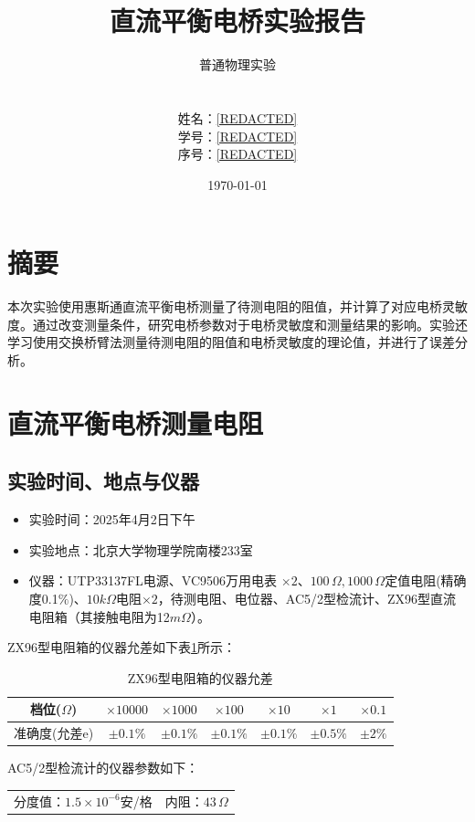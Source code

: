 \documentclass[12pt]{article}
\title{\Large\textbf{直流平衡电桥实验报告}}
\author{普通物理实验\\
        [REDACTED]\\
         \\
        姓名：\underline{\hspace{1cm}[REDACTED]\hspace{1cm}} \\
        学号：\underline{\hspace{0.5cm}[REDACTED]\hspace{0.5cm}} \\
        序号：\underline{\hspace{1.3cm}[REDACTED]\hspace{1.3cm}}}
\date{\today}
\begin{document}
\maketitle
\section{摘要}
\quad 本次实验使用惠斯通直流平衡电桥测量了待测电阻的阻值，并计算了对应电桥灵敏度。通过改变测量条件，研究电桥参数对于电桥灵敏度和测量结果的影响。实验还学习使用交换桥臂法测量待测电阻的阻值和电桥灵敏度的理论值，并进行了误差分析。
\section{直流平衡电桥测量电阻}
\subsection{实验时间、地点与仪器}
\begin{itemize}
    \item 实验时间：2025年4月2日下午
    \item 实验地点：北京大学物理学院南楼233室
    \item 仪器：UTP33137FL电源、VC9506万用电表 $\times 2$、$100\,\Omega ,1000\,\Omega$定值电阻(精确度0.1$\%$)、$10k\Omega$电阻$\times 2$，待测电阻、电位器、AC5/2型检流计、ZX96型直流电阻箱（其接触电阻为12$m\Omega$）。
\end{itemize}
\quad ZX96型电阻箱的仪器允差如下表\ref{tab:ZX96}所示：
\begin{table}[H]
    \centering
    \begin{tabular}{ccccccc}
        档位($\Omega$) & $\times 10000$ & $\times 1000$ & $\times 100$         & $\times 10$ & $\times 1$  & $\times 0.1$ \\ \hline
        准确度(允差e)     & $\pm 0.1\%$    & $\pm 0.1\%$   & \textbf{$\pm 0.1\%$} & $\pm 0.1\%$ & $\pm 0.5\%$ & $\pm 2\%$   
    \end{tabular}
    \caption{ZX96型电阻箱的仪器允差}
    \label{tab:ZX96}
\end{table}
AC5/2型检流计的仪器参数如下：
\begin{table}[H]
    \centering
    \begin{tabular}{cc}
        分度值：$1.5\times 10^{-6}$安/格 & 内阻：$43\,\Omega$
    \end{tabular}
\end{table}
\end{document}
